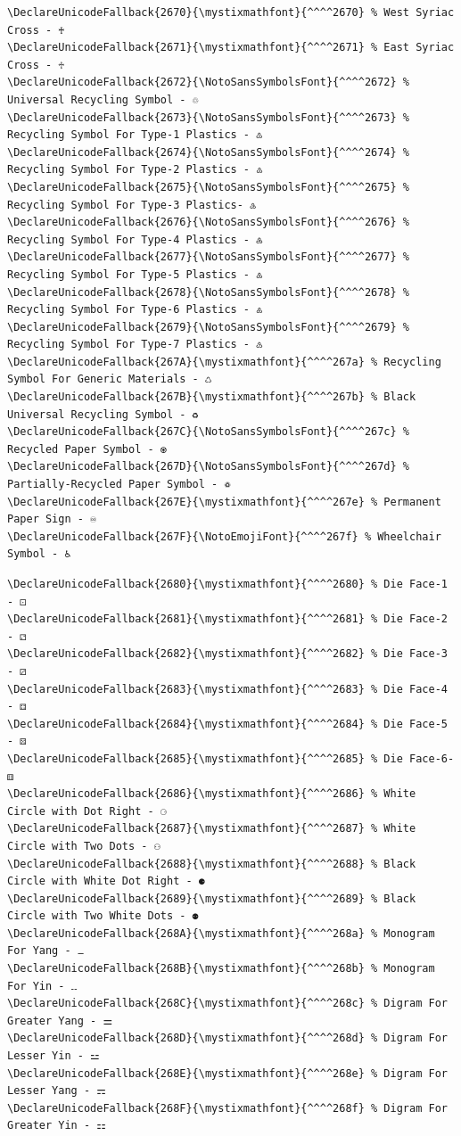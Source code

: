 \documentclass[12pt, twoside]{article}
\begin{document}
\newpage
\begin{verbatim}
\DeclareUnicodeFallback{2670}{\mystixmathfont}{^^^^2670} % West Syriac Cross - ♰
\DeclareUnicodeFallback{2671}{\mystixmathfont}{^^^^2671} % East Syriac Cross - ♱
\DeclareUnicodeFallback{2672}{\NotoSansSymbolsFont}{^^^^2672} % Universal Recycling Symbol - ♲
\DeclareUnicodeFallback{2673}{\NotoSansSymbolsFont}{^^^^2673} % Recycling Symbol For Type-1 Plastics - ♳
\DeclareUnicodeFallback{2674}{\NotoSansSymbolsFont}{^^^^2674} % Recycling Symbol For Type-2 Plastics - ♴
\DeclareUnicodeFallback{2675}{\NotoSansSymbolsFont}{^^^^2675} % Recycling Symbol For Type-3 Plastics- ♵
\DeclareUnicodeFallback{2676}{\NotoSansSymbolsFont}{^^^^2676} % Recycling Symbol For Type-4 Plastics - ♶
\DeclareUnicodeFallback{2677}{\NotoSansSymbolsFont}{^^^^2677} % Recycling Symbol For Type-5 Plastics - ♷
\DeclareUnicodeFallback{2678}{\NotoSansSymbolsFont}{^^^^2678} % Recycling Symbol For Type-6 Plastics - ♸
\DeclareUnicodeFallback{2679}{\NotoSansSymbolsFont}{^^^^2679} % Recycling Symbol For Type-7 Plastics - ♹
\DeclareUnicodeFallback{267A}{\mystixmathfont}{^^^^267a} % Recycling Symbol For Generic Materials - ♺
\DeclareUnicodeFallback{267B}{\mystixmathfont}{^^^^267b} % Black Universal Recycling Symbol - ♻
\DeclareUnicodeFallback{267C}{\NotoSansSymbolsFont}{^^^^267c} % Recycled Paper Symbol - ♼
\DeclareUnicodeFallback{267D}{\NotoSansSymbolsFont}{^^^^267d} % Partially-Recycled Paper Symbol - ♽
\DeclareUnicodeFallback{267E}{\mystixmathfont}{^^^^267e} % Permanent Paper Sign - ♾
\DeclareUnicodeFallback{267F}{\NotoEmojiFont}{^^^^267f} % Wheelchair Symbol - ♿

\end{verbatim}
\newpage
\begin{verbatim}
\DeclareUnicodeFallback{2680}{\mystixmathfont}{^^^^2680} % Die Face-1 - ⚀
\DeclareUnicodeFallback{2681}{\mystixmathfont}{^^^^2681} % Die Face-2 - ⚁
\DeclareUnicodeFallback{2682}{\mystixmathfont}{^^^^2682} % Die Face-3 - ⚂
\DeclareUnicodeFallback{2683}{\mystixmathfont}{^^^^2683} % Die Face-4 - ⚃
\DeclareUnicodeFallback{2684}{\mystixmathfont}{^^^^2684} % Die Face-5 - ⚄
\DeclareUnicodeFallback{2685}{\mystixmathfont}{^^^^2685} % Die Face-6- ⚅
\DeclareUnicodeFallback{2686}{\mystixmathfont}{^^^^2686} % White Circle with Dot Right - ⚆
\DeclareUnicodeFallback{2687}{\mystixmathfont}{^^^^2687} % White Circle with Two Dots - ⚇
\DeclareUnicodeFallback{2688}{\mystixmathfont}{^^^^2688} % Black Circle with White Dot Right - ⚈
\DeclareUnicodeFallback{2689}{\mystixmathfont}{^^^^2689} % Black Circle with Two White Dots - ⚉
\DeclareUnicodeFallback{268A}{\mystixmathfont}{^^^^268a} % Monogram For Yang - ⚊
\DeclareUnicodeFallback{268B}{\mystixmathfont}{^^^^268b} % Monogram For Yin - ⚋
\DeclareUnicodeFallback{268C}{\mystixmathfont}{^^^^268c} % Digram For Greater Yang - ⚌
\DeclareUnicodeFallback{268D}{\mystixmathfont}{^^^^268d} % Digram For Lesser Yin - ⚍
\DeclareUnicodeFallback{268E}{\mystixmathfont}{^^^^268e} % Digram For Lesser Yang - ⚎
\DeclareUnicodeFallback{268F}{\mystixmathfont}{^^^^268f} % Digram For Greater Yin - ⚏

\end{verbatim}
\end{document}
